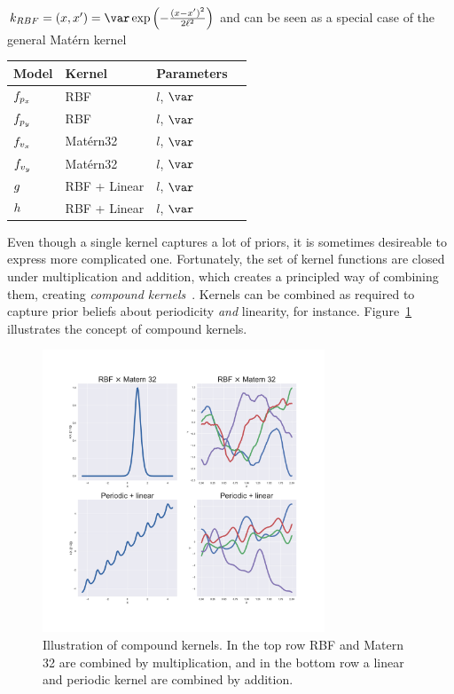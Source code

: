 $k_{RBF} = (x, x') = \var \exp \left( - \frac{{(x-x')}^2}{2\ell^2}
\right)$ and can be seen as a special case of the general Matérn kernel

\begin{center}
  \begin{tabular}{| l | l | l | l |}
    \hline
    Model & Kernel & Parameters \\ \hline
    $f_{p_x}$ & RBF & $l$, $\var$ \\ \hline
    $f_{p_y}$ & RBF & $l$, $\var$ \\ \hline
    $f_{v_x}$ & Matérn32 & $l$, $\var$ \\ \hline
    $f_{v_y}$ & Matérn32 & $l$, $\var$ \\ \hline
    $g$   & RBF + Linear & $l$, $\var$ \\ \hline
    $h$    & RBF + Linear & $l$, $\var$
    \hline
    \end{tabular}
\end{center}



Even though a single kernel captures a lot of priors, it is sometimes
desireable to express more complicated one. Fortunately,
the set of kernel functions are closed under multiplication and addition, which
creates a principled way of combining them, creating \textit{compound
  kernels}~\cite{duvenaud2013structure}. Kernels can be combined as
required to capture prior beliefs about periodicity \textit{and}
linearity, for instance. Figure~\ref{fig:compound-kernels} illustrates
the concept of compound kernels.
\begin{figure}
  \centering
  \includegraphics[width=0.75\textwidth]{figures/compound-kernels}
  \caption{Illustration of compound kernels. In the top row RBF
    and Matern 32 are combined by multiplication, and in the bottom
    row a linear and periodic kernel are combined by addition.}\label{fig:compound-kernels}
\end{figure}

